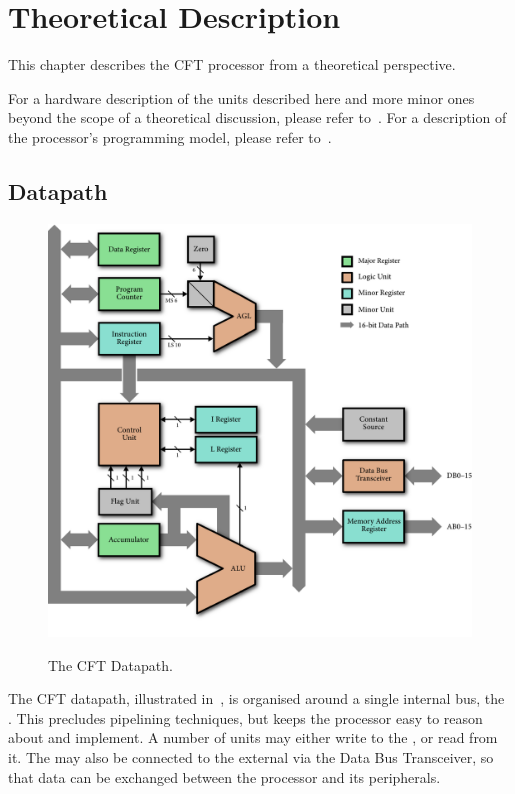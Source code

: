 \chapter{Theoretical Description}

This chapter describes the CFT processor from a theoretical
perspective.

For a hardware description of the units described here and more minor ones
beyond the scope of a theoretical discussion, please refer
to~. For a description of the
processor's programming model, please refer to~.


\section{Datapath}

\begin{figure}
\includegraphics[width=0.95\columnwidth]{figs/datapath2.pdf}\vspace{2em}\\
\caption[CFT Datapath]{\label{fig:datapath} The CFT Datapath. }
\end{figure}

The CFT datapath, illustrated in~, is organised around a
single internal bus, the \IBUS{}. This precludes pipelining techniques, but keeps
the processor easy to reason about and implement. A number of units may either
write to the \IBUS{}, or read from it. The \IBUS{} may also be connected to the
external \DBUS{} via the Data Bus Transceiver, so that data can be exchanged
between the processor and its peripherals.

